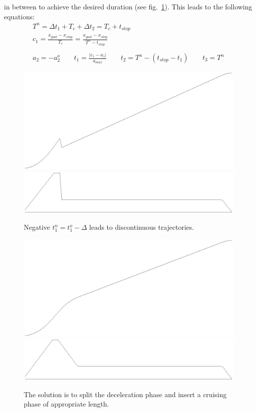 \documentclass[11pt,english]{article}
\newcommand{\xg}{x_{goal}}
\newcommand{\xs}{x_{stop}}
\newcommand{\ts}{t_{stop}}
\newcommand{\am}{a_{max}}
\newcommand{\abs}[1]{|#1|}
\begin{document}
in between to achieve the desired duration (see fig.~\ref{fig:ScaleOK}). This
leads to the following equations:
\begin{gather*}
  T^n = \Delta t_1 + T_c + \Delta t_2 = T_c + \ts \\
  c_1 = \frac{\xg - \xs}{T_c} = \frac{\xg - \xs}{T^n - \ts} \\
  \\
  a_2 = -a_2^o \qquad
  t_1 = \frac{\abs{c_1 - a_1}}{\am} \qquad
  t_2 = T^n - (\ts - t_1) \qquad
  t_3 = T^n
\end{gather*}
\begin{figure}
  \begin{minipage}[t]{0.45\linewidth}
    \includegraphics[width=\linewidth]{scaleerr-x.eps}
    \includegraphics[width=\linewidth]{scaleerr-v.eps}
    \caption{Negative $t_1^n = t_1^o - \Delta$ leads to discontinuous
      trajectories.}
    \label{fig:ScaleErr}
  \end{minipage}\hfill
  \begin{minipage}[t]{0.45\linewidth}
    \includegraphics[width=\linewidth]{scaleok-x.eps}
    \includegraphics[width=\linewidth]{scaleok-v.eps}
    \caption{The solution is to split the deceleration phase and insert a
      cruising phase of appropriate length.}
    \label{fig:ScaleOK}
  \end{minipage}
\end{figure}
\end{document}
